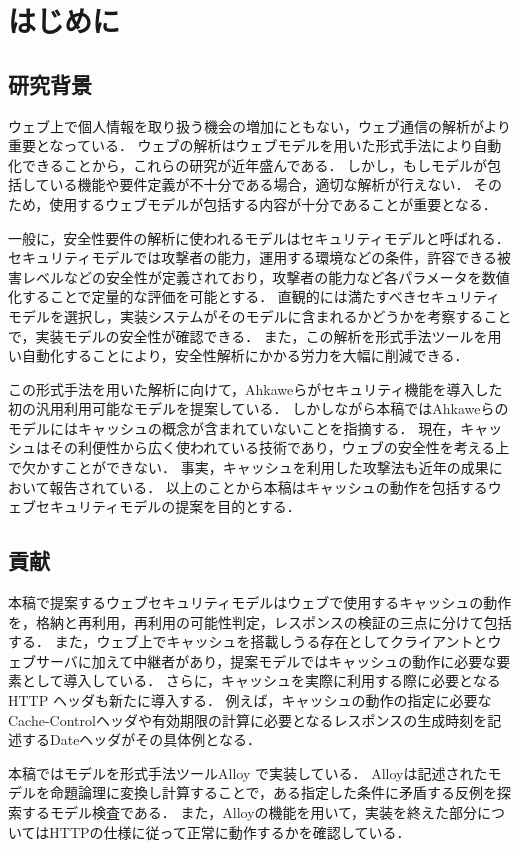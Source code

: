 \documentclass{css}
\begin{document}
\section{はじめに}
\subsection{研究背景}
ウェブ上で個人情報を取り扱う機会の増加にともない，ウェブ通信の解析がより重要となっている．
ウェブの解析はウェブモデルを用いた形式手法により自動化できることから，これらの研究が近年盛んである．
しかし，もしモデルが包括している機能や要件定義が不十分である場合，適切な解析が行えない．
そのため，使用するウェブモデルが包括する内容が十分であることが重要となる．

一般に，安全性要件の解析に使われるモデルはセキュリティモデルと呼ばれる．
セキュリティモデルでは攻撃者の能力，運用する環境などの条件，許容できる被害レベルなどの安全性が定義されており，攻撃者の能力など各パラメータを数値化することで定量的な評価を可能とする．
直観的には満たすべきセキュリティモデルを選択し，実装システムがそのモデルに含まれるかどうかを考察することで，実装モデルの安全性が確認できる．
また，この解析を形式手法ツールを用い自動化することにより，安全性解析にかかる労力を大幅に削減できる．

この形式手法を用いた解析に向けて，Ahkaweら\cite{webmodel}がセキュリティ機能を導入した初の汎用利用可能なモデルを提案している．
しかしながら本稿ではAhkaweらのモデルにはキャッシュの概念が含まれていないことを指摘する．
現在，キャッシュはその利便性から広く使われている技術であり，ウェブの安全性を考える上で欠かすことができない．
事実，キャッシュを利用した攻撃法も近年の成果において報告されている\cite{bcpattack}．
以上のことから本稿はキャッシュの動作を包括するウェブセキュリティモデルの提案を目的とする．

\subsection{貢献}
本稿で提案するウェブセキュリティモデルはウェブで使用するキャッシュの動作を，格納と再利用，再利用の可能性判定，レスポンスの検証の三点に分けて包括する．
また，ウェブ上でキャッシュを搭載しうる存在としてクライアントとウェブサーバに加えて中継者があり，提案モデルではキャッシュの動作に必要な要素として導入している．
さらに，キャッシュを実際に利用する際に必要となるHTTP ヘッダも新たに導入する．
例えば，キャッシュの動作の指定に必要なCache-Controlヘッダや有効期限の計算に必要となるレスポンスの生成時刻を記述するDateヘッダがその具体例となる．

本稿ではモデルを形式手法ツールAlloy で実装している．
Alloyは記述されたモデルを命題論理に変換し計算することで，ある指定した条件に矛盾する反例を探索するモデル検査である．
また，Alloyの機能を用いて，実装を終えた部分についてはHTTPの仕様に従って正常に動作するかを確認している．
\end{document}
